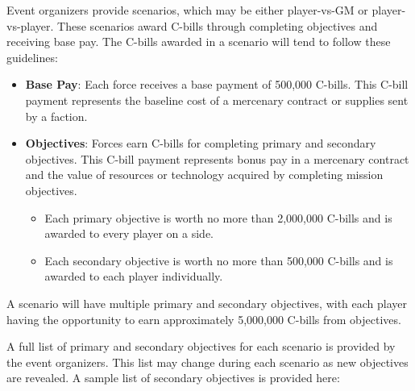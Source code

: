 Event organizers provide scenarios, which may be either player-vs-GM or player-vs-player.
These scenarios award C-bills through completing objectives and receiving base pay.
The C-bills awarded in a scenario will tend to follow these guidelines:

\begin{itemize}

\item {\bfseries Base Pay}: Each force receives a base payment of 500,000 C-bills.
This C-bill payment represents the baseline cost of a mercenary contract or supplies sent by a faction.

\item {\bfseries Objectives}: Forces earn C-bills for completing primary and secondary objectives.
This C-bill payment represents bonus pay in a mercenary contract and the value of resources or technology acquired by completing mission objectives.

\begin{itemize}

\item Each primary objective is worth no more than 2,000,000 C-bills and is awarded to every player on a side.

\item Each secondary objective is worth no more than 500,000 C-bills and is awarded to each player individually.

\end{itemize}

\end{itemize}

A scenario will have multiple primary and secondary objectives, with each player having the opportunity to earn approximately 5,000,000 C-bills from objectives.

A full list of primary and secondary objectives for each scenario is provided by the event organizers.
This list may change during each scenario as new objectives are revealed.
A sample list of secondary objectives is provided here:

